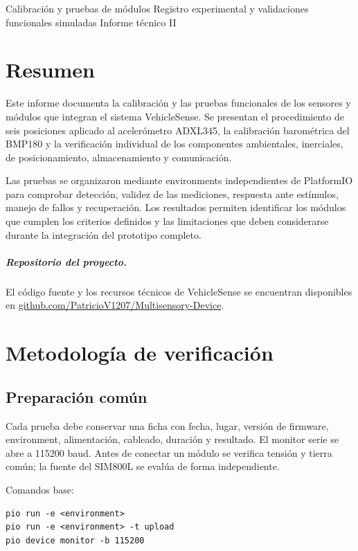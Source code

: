 \documentclass[11pt,a4paper,oneside]{report}
\begin{document}
\VScover
  {Calibración y pruebas de módulos}
  {Registro experimental y validaciones funcionales simuladas}
  {Informe técnico II}

\chapter*{Resumen}
Este informe documenta la calibración y las pruebas funcionales de los sensores y
módulos que integran el sistema VehicleSense. Se presentan el procedimiento de seis
posiciones aplicado al acelerómetro ADXL345, la calibración barométrica del BMP180 y
la verificación individual de los componentes ambientales, inerciales, de
posicionamiento, almacenamiento y comunicación.

Las pruebas se organizaron mediante environments independientes de PlatformIO para
comprobar detección, validez de las mediciones, respuesta ante estímulos, manejo de
fallos y recuperación. Los resultados permiten identificar los módulos que cumplen
los criterios definidos y las limitaciones que deben considerarse durante la
integración del prototipo completo.

\paragraph{Repositorio del proyecto.}
El código fuente y los recursos técnicos de VehicleSense se encuentran disponibles en
\href{https://github.com/PatricioV1207/Multisensory-Device}{github.com/PatricioV1207/Multisensory-Device}.

\tableofcontents
\listoffigures
\clearpage
{}

\chapter{Metodología de verificación}

\section{Preparación común}
Cada prueba debe conservar una ficha con fecha, lugar, versión de firmware,
environment, alimentación, cableado, duración y resultado. El monitor serie se abre a
115200 baud. Antes de conectar un módulo se verifica tensión y tierra común; la fuente
del SIM800L se evalúa de forma independiente.

Comandos base:
\begin{lstlisting}
pio run -e <environment>
pio run -e <environment> -t upload
pio device monitor -b 115200
\end{lstlisting}
\end{document}
